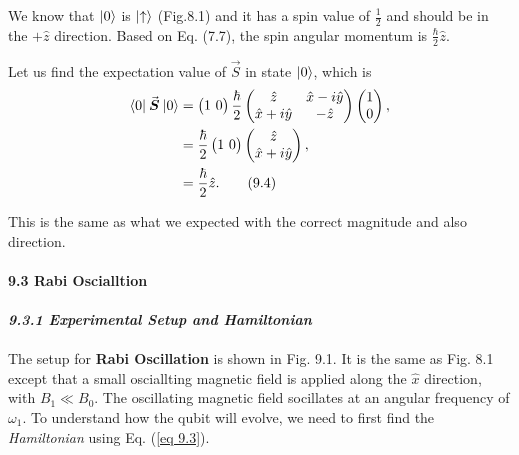 \documentclass{article}
\newcommand{\bfit}[1]{\textit{\textbf{#1}}}
\begin{document}
We know that $\ket{0}$ is $\ket{\uparrow}$ (Fig.8.1) and it has a spin value of $\frac{1}{2}$ 
and should be in the $+\hat{z}$ direction. Based on Eq. (7.7), the spin angular momentum is $\frac{\hbar}{2}\hat{z}$.

Let us find the expectation value of $\vec{S}$ in state $\ket{0}$, which is
\begin{align*}\label{eq 9.4}
    \braket{0|\: \vec{\boldsymbol{S}} \:|0}&=\begin{pmatrix}
        1\ 0
    \end{pmatrix}\frac{\hbar}{2}
    \begin{pmatrix}
        \hat{z}&\hat{x}-i\hat{y}\\
        \hat{x}+i\hat{y}&-\hat{z}
    \end{pmatrix}
    \begin{pmatrix}
        1\\0
    \end{pmatrix},\\
    &=\frac{\hbar}{2}\begin{pmatrix}
        1\ 0
    \end{pmatrix}
    \begin{pmatrix}
        \hat{z}\\\hat{x}+i\hat{y}
    \end{pmatrix},\\
    &=\frac{\hbar}{2}\hat{z}.\tag{9.4}
\end{align*}

This is the same as what we expected with the correct magnitude and also direction.\\\\
\textbf{\large 9.3 Rabi Oscialltion}\\\\
\bfit{\large 9.3.1 Experimental Setup and Hamiltonian}\\\\
The setup for \textbf{Rabi Oscillation} is shown in Fig. 9.1. It is the same as Fig. 8.1
except that a small osciallting magnetic field is applied along the $\hat{x}$ direction, with 
$B_1\ll B_0$. The oscillating magnetic field socillates at an angular frequency of $\omega_1$.
To understand how the qubit will evolve, we need to first find the \textit{Hamiltonian} using
Eq. (\ref{eq 9.3}).
\end{document}
